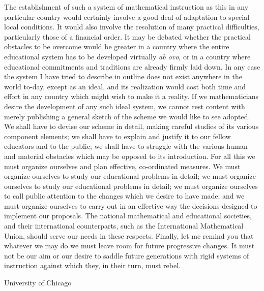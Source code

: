 The establishment of such a system of mathematical instruction as this in any particular country would certainly involve a good deal of adaptation to special local conditions. It would also involve the resolution of many practical difficulties, particularly those of a financial order. It may be debated whether the practical obstacles to be overcome would be greater in a country where the entire educational system has to be developed virtually {\em ab ovo}, or in a country where educational commitments and traditions are already firmly laid down. In any case the system I have tried to describe in outline does not exist anywhere in the world to-day, except as an ideal, and its realization would cost both time and effort in any country which might wish to make it a reality. If we mathematicians desire the development of any such ideal system, we cannot rest content with merely publishing a general sketch of the scheme we would like to see adopted. We shall have to devise our scheme in detail, making careful studies of its various component elements; we shall have to explain and justify it to our fellow educators and to the public; we shall have to struggle with the various human and material obstacles which may be opposed to its introduction. For all this we must organize ourselves and plan effective, co-ordinated measures. We must organize ourselves to study our educational problems in detail; we must organize ourselves to study our educational problems in detail; we must organize ourselves to call public attention to the changes which we desire to have made; and we must organize ourselves to carry out in an effective way the decisions designed to implement our proposals. The national mathematical and educational societies, and their international counterparts, such as the International Mathematical Union, should serve our needs in these respects. Finally, let me remind you that whatever we may do we must leave room for future progressive changes. It must not be our aim or our desire to saddle future generations with rigid systems of instruction against which they, in their turn, must rebel.

\bigskip
\medskip

{\fontsize{9pt}{11pt}\selectfont University of Chicago}\relax




